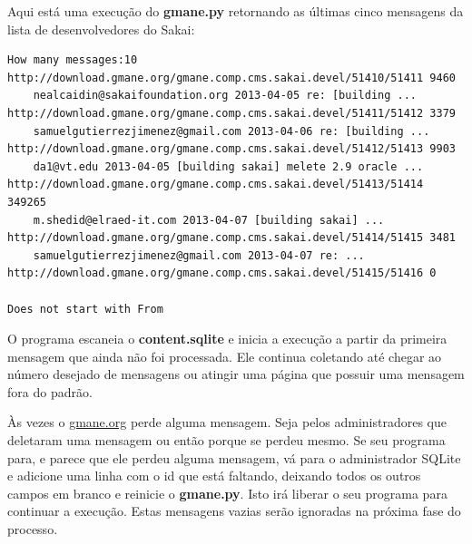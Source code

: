 Aqui está uma execução do {\bf gmane.py} retornando as últimas cinco 
mensagens da lista de desenvolvedores do Sakai:

\beforeverb
\begin{verbatim}
How many messages:10
http://download.gmane.org/gmane.comp.cms.sakai.devel/51410/51411 9460
    nealcaidin@sakaifoundation.org 2013-04-05 re: [building ...
http://download.gmane.org/gmane.comp.cms.sakai.devel/51411/51412 3379
    samuelgutierrezjimenez@gmail.com 2013-04-06 re: [building ...
http://download.gmane.org/gmane.comp.cms.sakai.devel/51412/51413 9903
    da1@vt.edu 2013-04-05 [building sakai] melete 2.9 oracle ...
http://download.gmane.org/gmane.comp.cms.sakai.devel/51413/51414 349265
    m.shedid@elraed-it.com 2013-04-07 [building sakai] ...
http://download.gmane.org/gmane.comp.cms.sakai.devel/51414/51415 3481
    samuelgutierrezjimenez@gmail.com 2013-04-07 re: ...
http://download.gmane.org/gmane.comp.cms.sakai.devel/51415/51416 0

Does not start with From 
\end{verbatim}
\afterverb
%

O programa escaneia o {\bf content.sqlite} e inicia a execução a partir da primeira
mensagem que ainda não foi processada. Ele continua coletando até chegar ao número
desejado de mensagens ou atingir uma página que possuir uma mensagem fora do padrão.

Às vezes o \url{gmane.org} perde alguma mensagem. Seja pelos administradores que deletaram
uma mensagem ou então porque se perdeu mesmo. Se seu programa para, e parece que ele perdeu alguma 
mensagem, vá para o administrador SQLite e adicione uma linha com o id que está faltando,
deixando todos os outros campos em branco e reinicie o {\bf gmane.py}. Isto irá liberar o 
seu programa para continuar a execução. Estas mensagens vazias serão ignoradas na próxima 
fase do processo.

